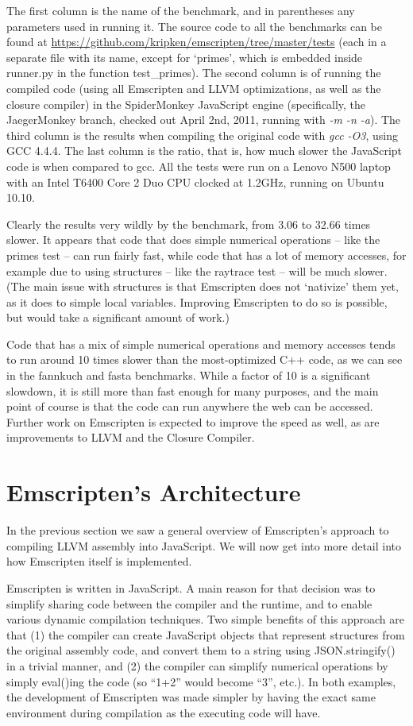 \documentclass[11pt]{proc}
\begin{document}
The first column is the name of the benchmark, and in parentheses any
parameters used in running it. The source code to all the benchmarks
can be found at \url{https://github.com/kripken/emscripten/tree/master/tests}
(each in a separate file with its name, except for `primes', which is
embedded inside runner.py in the function test\_primes). The second
column is of running the compiled code (using all Emscripten and LLVM
optimizations, as well as the closure compiler) in the SpiderMonkey JavaScript
engine (specifically, the JaegerMonkey branch, checked out April 2nd, 2011, running with \emph{-m -n -a}).
The third column is the results when compiling the original code with \emph{gcc -O3},
using GCC 4.4.4. The last column is the ratio, that is, how much slower the JavaScript code is
when compared to gcc. All the tests were run on a Lenovo N500 laptop with
an Intel T6400 Core 2 Duo CPU clocked at 1.2GHz, running on Ubuntu 10.10.

Clearly the results very wildly by the benchmark, from 3.06 to 32.66 times
slower. It appears that code that does simple numerical operations -- like
the primes test -- can run fairly fast, while code that has a lot of memory
accesses, for example due to using structures -- like the raytrace test --
will be much slower. (The main issue with structures is that Emscripten does not
`nativize' them yet, as it does to simple local variables. Improving Emscripten to
do so is possible,
but would take a significant amount of work.)

Code that has a mix of simple numerical operations and memory accesses
tends to run around 10 times slower than the most-optimized C++ code,
as we can see in the fannkuch and fasta benchmarks. While a factor of 10
is a significant slowdown, it is still more than fast enough for
many purposes, and the main point of course is that the code can run
anywhere the web can be accessed. Further work on Emscripten is expected to
improve the speed as well, as are improvements to LLVM and the Closure
Compiler.

\section{Emscripten's Architecture}

In the previous section we saw a general overview of Emscripten's approach
to compiling LLVM assembly into JavaScript. We will now get into more detail
into how Emscripten itself is implemented.

Emscripten is written in JavaScript. A main reason for that decision
was to simplify sharing code between the compiler and the runtime, and
to enable various dynamic compilation techniques. Two simple benefits of this approach are that (1)
the compiler can create JavaScript objects that represent structures from the original
assembly code, and convert them to a string using JSON.stringify()
in a trivial manner,
and (2) the compiler can simplify numerical operations by simply
eval()ing the code (so ``1+2'' would become ``3'', etc.). In both examples,
the development of Emscripten was made simpler by having the exact same environment
during compilation as the executing code will have.
\end{document}
